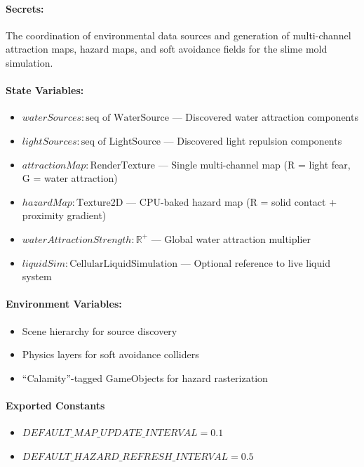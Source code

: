 \documentclass[12pt, titlepage]{article}
\begin{document}
\paragraph{Secrets:}
The coordination of environmental data sources and generation of multi-channel attraction maps,
hazard maps, and soft avoidance fields for the slime mold simulation.

\paragraph{State Variables:}
\begin{itemize}
\item $waterSources : \text{seq of WaterSource}$ --- Discovered water attraction components
\item $lightSources : \text{seq of LightSource}$ --- Discovered light repulsion components
\item $attractionMap : \text{RenderTexture}$ --- Single multi-channel map (R = light fear, G = water attraction)
\item $hazardMap : \text{Texture2D}$ --- CPU-baked hazard map (R = solid contact + proximity gradient)
\item $waterAttractionStrength : \mathbb{R}^+$ --- Global water attraction multiplier
\item $liquidSim : \text{CellularLiquidSimulation}$ --- Optional reference to live liquid system
\end{itemize}

\paragraph{Environment Variables:}
\begin{itemize}
\item Scene hierarchy for source discovery
\item Physics layers for soft avoidance colliders
\item ``Calamity''-tagged GameObjects for hazard rasterization
\end{itemize}

\paragraph{Exported Constants}
\begin{itemize}
\item $DEFAULT\_MAP\_UPDATE\_INTERVAL = 0.1$
\item $DEFAULT\_HAZARD\_REFRESH\_INTERVAL = 0.5$
\end{itemize}
\end{document}
